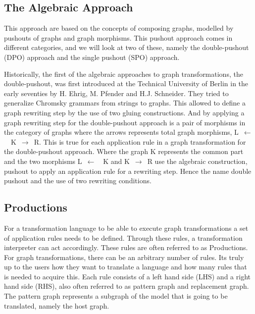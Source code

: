 \subsection{The Algebraic Approach}
\noindent This approach are based on the concepts of composing graphs, modelled
by pushouts of graphs and graph morphisms. This pushout approach comes in
different categories, and we will look at two of these, namely the
double-pushout (DPO) approach and the single pushout (SPO) approach\cite{Loewe1997,Ehrig1997}.

\indent Historically, the first of the algebraic approaches to graph
transformations, the double-pushout, was first introduced at the Technical
University of Berlin in the early seventies by H. Ehrig, M. Pfender and H.J.
Schneider\cite{INSPEC:606170}. They tried to generalize Chromsky grammars from
strings to graphs. This allowed to define a graph rewriting step by the use of
two gluing constructions. And by applying a graph rewriting step for the
double-pushout approach is a pair of morphisms in the category of graphs where
the arrows represents total graph morphisms, \linebreak\mbox{L $\longleftarrow$
\ K $\longrightarrow$ R}. This is true for each application rule in a graph
transformation for the double-pushout approach. Where the graph K represents the
common part and the two morphisms \mbox{L $\longleftarrow$ \ K} and \mbox{K
$\longrightarrow$ R} use the algebraic construction, pushout to apply an
application rule for a rewriting step. Hence the name double pushout and the use
of two rewriting conditions.

\subsection{Productions}
\noindent For a transformation language to be able to execute graph
transformations a set of application rules needs to be defined. Through these
rules, a transformation interpreter can act accordingly. These rules are often
referred to as Productions. For graph transformations, there can be an arbitrary
number of rules. Its truly up to the users how they want to translate a
language and how many rules that is needed to acquire this. Each rule consists
of a left hand side (LHS) and a right hand side (RHS), also often referred to as
pattern graph and replacement graph. The pattern graph represents a subgraph of
the model that is going to be translated, namely the host graph.

